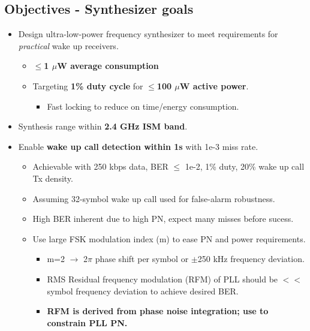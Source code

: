 \documentclass[10pt,a4paper]{article}
\begin{document}
		\flushleft
		\subsection{Objectives - Synthesizer goals}
		\begin{itemize}
			\footnotesize
			\item Design ultra-low-power frequency synthesizer to meet requirements for \textit{practical} wake up receivers.
			\begin{itemize}
				\footnotesize
				\item \textbf{$\leq$1 $\mu$W average consumption}
				\item Targeting \textbf{1\% duty cycle} for \textbf{$\leq$100 $\mu$W active power}.
				\begin{itemize}
					\item Fast locking to reduce on time/energy consumption.
				\end{itemize}
			\end{itemize} 
			\item Synthesis range within \textbf{2.4 GHz ISM band}.
			\item Enable \textbf{wake up call detection within 1s} with 1e-3 miss rate.
			\begin{itemize}
				\scriptsize
				\item Achievable with 250 kbps data, BER $\leq$ 1e-2, 1\% duty, 20\% wake up call Tx density.
				\item Assuming 32-symbol wake up call used for false-alarm robustness.
				\item High BER inherent due to high PN, expect many misses before sucess.  
				\item Use large FSK modulation index (m) to ease PN and power requirements. 
				\begin{itemize}
					\scriptsize
					\item m=2 $\rightarrow$ 2$\pi$ phase shift per symbol or $\pm$250 kHz frequency deviation.
					\item RMS Residual frequency modulation (RFM) of PLL should be $<<$ symbol frequency deviation to achieve desired BER.
					\item \textbf{RFM is derived from phase noise integration; use to constrain PLL PN.}
				\end{itemize}
			\end{itemize}      
		\end{itemize}

		\flushleft
\end{document}
